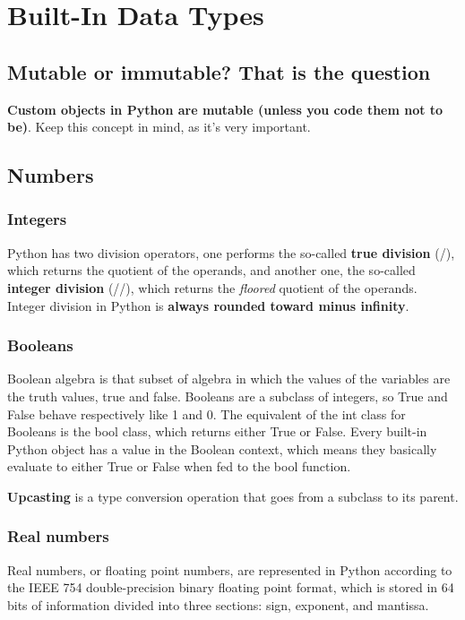\chapter{Built-In Data Types\label{Ch02}}
\section{Mutable or immutable? That is the question}
\textbf{Custom objects in Python are mutable (unless you code them not to be)}. Keep this concept in mind, as it's very important.
\section{Numbers}
\subsection{Integers}
Python has two division operators, one performs the so-called \textbf{true division} (/), which returns the quotient of the operands, and another one, the so-called \textbf{integer division} (//), which returns the \textit{floored} quotient of the operands. Integer division in Python is \textbf{always rounded toward minus infinity}.
\subsection{Booleans}
Boolean algebra is that subset of algebra in which the values of the variables are the truth values, true and false. Booleans are a subclass of integers, so True and False behave respectively like 1 and 0. The equivalent of the int class for Booleans is the bool class, which returns either True or False. Every built-in Python object has a value in the Boolean context, which means they basically evaluate to either True or False when fed to the bool function.

\textbf{Upcasting} is a type conversion operation that goes from a subclass to its parent.
\subsection{Real numbers}
Real numbers, or floating point numbers, are represented in Python according to the IEEE 754 double-precision binary floating point format, which is stored in 64 bits of information divided into three sections: sign, exponent, and mantissa.